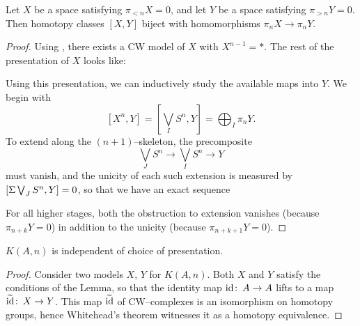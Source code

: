 \begin{lemma}\label{ConnToCoconnIsAlgebraic}%
Let $X$ be a space satisfying $\pi_{< n} X = 0$, and let $Y$ be a space satisfying $\pi_{> n} Y = 0$.
Then homotopy classes $[X, Y]$ biject with homomorphisms $\pi_n X \to \pi_n Y$.
\end{lemma}
\begin{proof}
Using , there exists a CW model of $X$ with $X^{n-1} = *$.
The rest of the presentation of $X$ looks like:
\begin{center}
\end{center}
Using this presentation, we can inductively study the available maps into $Y$.
We begin with \[[X^n, Y] = \left[\bigvee_I S^n, Y\right] = \bigoplus_I \pi_n Y.\]
To extend along the $(n+1)$--skeleton, the precomposite \[\bigvee_J S^n \to \bigvee_I S^n \to Y\] must vanish, and the unicity of each such extension is measured by $[\Sigma \bigvee_J S^n, Y] = 0$, so that we have an exact sequence
\begin{center}
\end{center}
For all higher stages, both the obstruction to extension vanishes (because $\pi_{n+k} Y = 0$) in addition to the unicity (because $\pi_{n+k+1} Y = 0$).
\end{proof}

\begin{corollary}
$K(A, n)$ is independent of choice of presentation.
\end{corollary}
\begin{proof}
Consider two models $X$, $Y$ for $K(A, n)$.
Both $X$ and $Y$ satisfy the conditions of the Lemma, so that the identity map $\operatorname{id}\colon\thinspace A \to A$ lifts to a map $\widetilde{\operatorname{id}}\colon\thinspace X \to Y$.
This map $\widetilde{\operatorname{id}}$ of CW--complexes is an isomorphism on homotopy groups, hence Whitehead's theorem witnesses it as a homotopy equivalence.
\end{proof}

